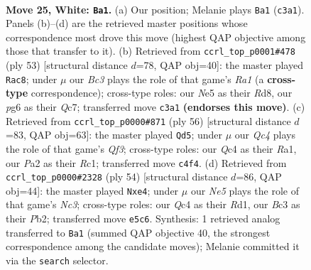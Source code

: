 \documentclass[11pt]{article}
\begin{document}
\clearpage

\begin{figure}[p]\centering
\begin{subfigure}{0.46\textwidth}\centering
\resizebox{\linewidth}{!}{%
\newchessgame
\chessboard[
  setfen={r1b3k1/1p1nq2p/4r1p1/p3Np2/2Q5/2B1P1P1/P4PKP/1R2R3 w - - 4 25},
  showmover=false,
  pgfstyle=straightmove, color=movearrow, markmove={c3-a1}
]}
\caption{}
\end{subfigure}\hfill
\begin{subfigure}{0.46\textwidth}\centering
\resizebox{\linewidth}{!}{%
\newchessgame
\chessboard[
  setfen={r2r2k1/2q2pp1/1p2pn1p/8/3Pb3/1RPBN2P/4QPP1/1R4K1 b - - 5 27},
  showmover=false,
  pgfstyle=straightmove, color=movearrow, markmove={a8-c8}
]}
\caption{}
\end{subfigure}
\\[4pt]
\begin{subfigure}{0.46\textwidth}\centering
\resizebox{\linewidth}{!}{%
\newchessgame
\chessboard[
  setfen={q1r1kn2/4p2p/rpn1Npp1/8/2PB3P/5QP1/4PPK1/R1R5 w - - 5 29},
  showmover=false,
  pgfstyle=straightmove, color=movearrow, markmove={f3-d5}
]}
\caption{}
\end{subfigure}\hfill
\begin{subfigure}{0.46\textwidth}\centering
\resizebox{\linewidth}{!}{%
\newchessgame
\chessboard[
  setfen={3q2k1/p4pp1/1pbrp2p/8/4n1Q1/P1N1P2P/1P2BPP1/3R2K1 w - - 8 28},
  showmover=false,
  pgfstyle=straightmove, color=movearrow, markmove={c3-e4}
]}
\caption{}
\end{subfigure}
\caption{\textbf{Move 25, White: \texttt{Ba1}.} (a) Our position; Melanie plays \texttt{Ba1} (\texttt{c3a1}). Panels (b)--(d) are the retrieved master positions whose correspondence most drove this move (highest QAP objective among those that transfer to it). (b) Retrieved from \texttt{ccrl\_top\_p0001\#478} (ply 53) [structural distance $d$=78, QAP obj=40]: the master played \texttt{Rac8}; under $\mu$ our \emph{Bc3} plays the role of that game's \emph{Ra1} (a \textbf{cross-type} correspondence); cross-type roles: our \emph{N}e5 as their \emph{R}d8, our \emph{p}g6 as their \emph{Q}c7; transferred move \texttt{c3a1} \textbf{(endorses this move)}. (c) Retrieved from \texttt{ccrl\_top\_p0000\#871} (ply 56) [structural distance $d$=83, QAP obj=63]: the master played \texttt{Qd5}; under $\mu$ our \emph{Qc4} plays the role of that game's \emph{Qf3}; cross-type roles: our \emph{Q}c4 as their \emph{R}a1, our \emph{P}a2 as their \emph{R}c1; transferred move \texttt{c4f4}. (d) Retrieved from \texttt{ccrl\_top\_p0000\#2328} (ply 54) [structural distance $d$=86, QAP obj=44]: the master played \texttt{Nxe4}; under $\mu$ our \emph{Ne5} plays the role of that game's \emph{Nc3}; cross-type roles: our \emph{Q}c4 as their \emph{R}d1, our \emph{B}c3 as their \emph{P}b2; transferred move \texttt{e5c6}. Synthesis: 1 retrieved analog transferred to \texttt{Ba1} (summed QAP objective 40, the strongest correspondence among the candidate moves); Melanie committed it via the \texttt{search} selector.}
\label{fig:thought-m48}
\end{figure}
\end{document}
